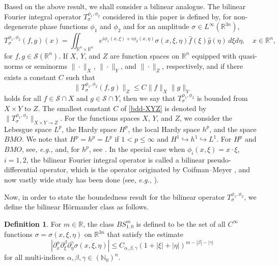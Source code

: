 \documentclass[12pt]{amsart}
\numberwithin{equation}{section}
\theoremstyle{plain}
\theoremstyle{definition}
\newtheorem{defn}[thm]{Definition}
\newcommand{\N}{\mathbb{N}}
\newcommand{\R}{\mathbb{R}}
\newcommand{\calS}{\mathcal{S}}
\begin{document}
Based on the above result,
we shall consider a bilinear analogue.
The bilinear Fourier integral operator 
$T_{\sigma}^{\phi_1, \phi_2}$
considered in this paper
is defined by,
for non-degenerate phase functions $\phi_1$ and $\phi_2$
and for an amplitude $\sigma \in L^{\infty} (\R^{3n})$,
\begin{equation*}
T_{\sigma}^{\phi_1, \phi_2} (f, g) (x)
= 
\iint_{\R^n \times \R^n} 
e^{i \phi_1(x, \xi)+ i \phi_2 (x, \eta)} 
\sigma(x, \xi, \eta)
\widehat{f} (\xi) \widehat{g} (\eta) 
\,d\xi d\eta ,
\quad x \in \R^n,
\end{equation*}
for $f, g \in \calS(\R^n)$.
If $X$, $Y$, and $Z$ are function spaces on $\R^n$ 
equipped with quasi-norms or seminorms 
$\|\cdot\|_{X}$, $\|\cdot\|_{Y}$, and 
$\|\cdot\|_{Z}$, respectively,
and if there exists a constant $C$
such that
\begin{equation}\label{bdd-XYZ}
\|T_{\sigma}^{\phi_1, \phi_2} (f, g)\|_{Z}
\le C \|f\|_{X}\|g\|_{Y} 
\end{equation}
holds for all 
$f \in \calS \cap X$ and $g \in \calS \cap Y$, 
then we say that 
$T_{\sigma}^{\phi_1, \phi_2}$ is bounded from 
$X \times Y$ to $Z$. 
The smallest constant $C$ of 
\eqref{bdd-XYZ} 
is denoted by 
$\|T_{\sigma}^{\phi_1, \phi_2}\|_{X \times Y \to Z}$. 
For the functions spaces $X$, $Y$, and $Z$,
we consider the Lebesgue space $L^p$,
the Hardy space $H^p$,
the local Hardy space $h^p$, 
and the space $BMO$.
We note that
$H^p = h^p = L^p$ if $1<p\le \infty$ and 
$H^1 \hookrightarrow h^1 \hookrightarrow L^1$. 
For $H^p$ and $BMO$, see, 
{\it e.g.,} \cite[Chapters III and IV]{S}
and, for $h^p$, see \cite{Goldberg}.  
In the special case when
$\phi_{i}(x,\xi) = x \cdot \xi$, $i=1,2$,
the bilinear Fourier integral operator is called 
a bilinear pseudo-differential operator,
which is the operator originated by Coifman--Meyer \cite{CM},
and now vastly wide study has been done 
(see, {\it e.g.}, \cite{BBMNT, BT, GT}).


Now, 
in order to state the boundedness result 
for the bilinear operator $T_{\sigma}^{\phi_1, \phi_2}$,
we define the bilinear H\"ormander class as follows.


\begin{defn}\label{def-BSm10} 
For $m\in \R$, 
the class $BS^{m}_{1,0}$ is defined to be the set of all 
$C^{\infty}$ functions $\sigma = \sigma (x, \xi, \eta)$ 
on $\R^{3n}$ 
that satisfy the estimate 
\begin{equation*}
\left|
\partial^{\alpha}_{x} 
\partial^{\beta}_{\xi} 
\partial^{\gamma}_{\eta} 
\sigma (x, \xi, \eta)
\right| 
\le 
C_{\alpha, \beta, \gamma} 
\left( 1+ |\xi| + |\eta|\right)^{m-|\beta|-|\gamma|}
\end{equation*}
for all multi-indices $\alpha, \beta, \gamma \in (\N_0)^{n}$. 
\end{defn}
\end{document}
